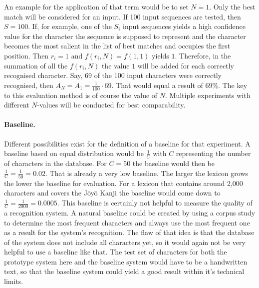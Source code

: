 An example for the application of that term would be to set \(N = 1\).
Only the best match will be considered for an input.
If 100 input sequences are tested, then \(S=100\). 
If, for example, one of the \(S_{i}\) input sequences yields a high 
confidence value for the character the sequence is supposed to represent and 
the character becomes the most salient in the list of best matches
and occupies the first position. Then \(r_{i} = 1\) and \(f(r_{i},N) = f(1,1)\) 
yields \(1\).
Therefore, in the summation of all the \(f(r_{i},N)\) the value \(1\) 
will be added for each correctly recognised character.
Say, \(69\) of the \(100\) input characters were correctly recognised,
then \(A_{N} = A_{1} = \frac{1}{100} \cdot 69\). That would equal a 
result of \(69\%\). The key to this evaluation method is of course the 
value of \(N\). Multiple experiments with different \(N\)-values will be 
conducted for best comparability.

\paragraph{Baseline.} Different possibilities exist for the definition of a 
baseline for that experiment. A baseline based on equal distribution would 
be \(\frac{1}{C}\) with \(C\) representing the number of characters 
in the database. 
For \(C = 50\) the baseline would then be \(\frac{1}{C} = \frac{1}{50} = 0.02\).
That is already a very low baseline. The larger the lexicon grows the
lower the baseline for evaluation. For a lexicon that contains around 2,000 
characters and covers the Jōyō Kanji the baseline would come down to
\(\frac{1}{C} = \frac{1}{2000} = 0.0005\).
This baseline is certainly not helpful to measure the quality of a 
recognition system. A natural baseline could be created by using 
a corpus study to determine the most frequent characters and always use
the most frequent one as a result for the system's recognition.
The flaw of that idea is that the database of the system does not
include all characters yet, so it would again not be very helpful to use
a baseline like that. The test set of characters for both the prototype
system here and the baseline system would have to be 
a handwritten text, so that the baseline system could yield a good result
within it's technical limits.

